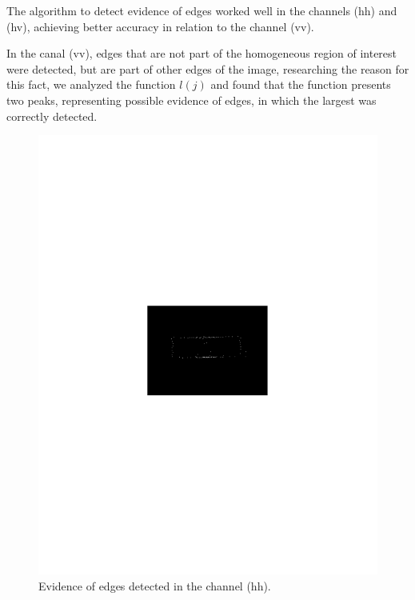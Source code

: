 \documentclass[conference]{IEEEtran}
\begin{document}
{{{{The algorithm to detect evidence of edges worked well in the channels (hh) and (hv), achieving better accuracy in relation to the channel (vv).  

In the canal (vv), edges that are not part of the homogeneous region of interest were detected, but are part of other edges of the image, researching the reason for this fact, we analyzed the function $l(j)$ and found that the function presents two peaks, representing possible evidence of edges, in which the largest was correctly detected. 

\begin{figure}[hbt]
	\includegraphics[scale=0.75]{flevoland_hh_evid_crop.pdf}
		\vspace{-6.0cm}
	\caption{Evidence of edges detected in the channel (hh).}
\label{fig_02}
\end{figure}
\begin{figure}[hbt]

\end{figure}}}}}
\end{document}
